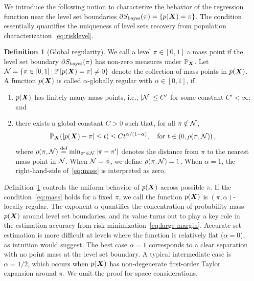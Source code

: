 \documentclass[11pt]{article}
\theoremstyle{definition}
\newtheorem{defn}{Definition}
\def\bayesS{S_{\textup{bayes}}}
\begin{document}
We introduce the following notion to characterize the behavior of the regression function near the level set boundaries $\partial S_{\text{bayes}}(\pi) = \{ p(\bm X)= \pi\}$. The condition essentially quantifies the uniqueness of level sets recovery from population characterization~\eqref{eq:risklevel}.

\begin{defn} [Global regularity]\label{ass:decboundary}We call a level $\pi\in[0,1]$ a mass point if the level set boundary $\partial \bayesS(\pi)$ has non-zero measures under $\mathbb{P}_{\bm X}$. Let $\mathcal{N}=\{\pi\in[0,1] \colon \mathbb{P}\left[p(\bm X)=\pi\right]\neq 0\}$ denote the collection of mass points in $p(\bm X)$. A function $p(\bm X)$ is called $\alpha$-globally regular with $\alpha\in[0,1]$, if 
\begin{enumerate}[label=(\roman*),wide, labelwidth=!, labelindent=0pt,topsep=-5pt,itemsep=-1ex,partopsep=0ex,parsep=1ex]
\item $p(\bm X)$ has finitely many mass points, i.e., $|\mathcal{N}|\leq C'$ for some constant $C'<\infty$; and 
\item 
there exists a global constant $C>0$ such that, for all $\pi \notin \mathcal{N} $,
\begin{equation}\label{eq:mass}
\mathbb{P}_{\bm X}(|p(\bm X)-\pi|\leq t)\leq Ct^{\alpha/(1-\alpha)}, \quad \text{for }t\in \left(0,\rho(\pi,\mathcal{N})\right),
\end{equation}
where $\rho(\pi,\mathcal{N})\stackrel{\text{def}}{=}\min_{\pi'\in \mathcal{N}} |\pi-\pi'|$  denotes the distance from $\pi$ to the nearest mass point in $\mathcal{N}$. When $\mathcal{N} = \phi$, we define $\rho(\pi,\mathcal{N})=1$. When $\alpha=1$, the right-hand-side of~\eqref{eq:mass} is interpreted as zero.
\end{enumerate}
\end{defn}

Definition~\ref{ass:decboundary} controls the uniform behavior of $p(\bm X)$ across possible $\pi$. If the condition~\eqref{eq:mass} holds for a fixed $\pi$, we call the function $p(\bm X)$ is $(\pi,\alpha)$-locally regular. The exponent $\alpha$ quantifies the concentration of probability mass $p(\bm X)$ around level set boundaries, and its value turns out to play a key role in the estimation accuracy from risk minimization~\eqref{eq:large-margin}. Accurate set estimation is more difficult at levels where the function is relatively flat ($\alpha = 0$), as intuition would suggest. The best case $\alpha=1$ corresponds to a clear separation with no point mass at the level set boundary. A typical intermediate case is $\alpha=1/2$, which occurs when $p(\bm X)$ has non-degenerate first-order Taylor expansion around $\pi$. We omit the proof for space considerations.
\end{document}
